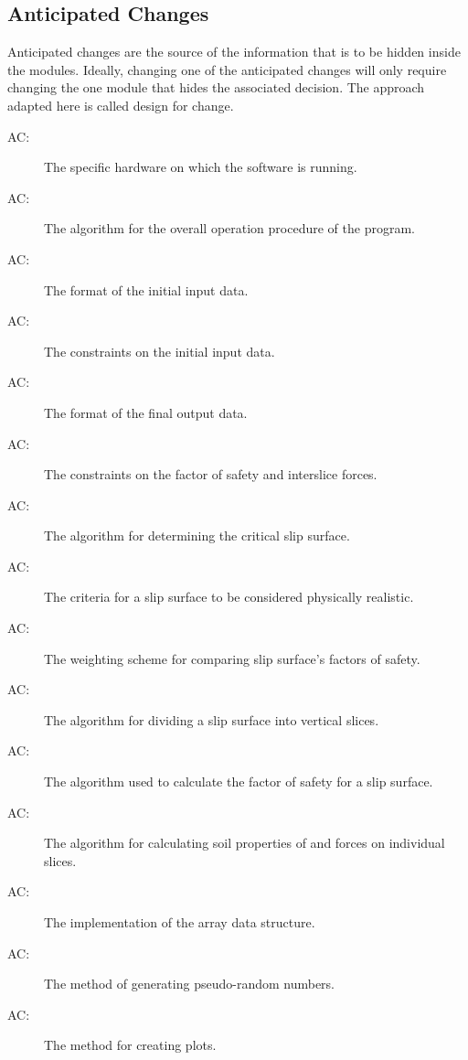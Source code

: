 \documentclass[12pt, titlepage]{article}
\newcounter{acnum}
\begin{document}
\subsection{Anticipated Changes} \label{SecAchange}

\hspace{3ex}Anticipated changes are the source of the information that
is to be hidden inside the modules. Ideally, changing one of the
anticipated changes will only require changing the one module that
hides the associated decision. The approach adapted here is called
design for change.

\begin{description}
\item[AC\theacnum \label{AC_hardware}:] The
  specific hardware on which the software is running.
\item[AC\theacnum \label{AC_Control}:] The
  algorithm for the overall operation procedure of the program.
\item[AC\theacnum \label{AC_input}:] The format
  of the initial input data.
\item[AC\theacnum \label{AC_inputConstraints}:] The       
constraints on the initial input data.
\item[AC\theacnum \label{AC_output}:] The format
  of the final output data.
\item[AC\theacnum \label{AC_outputConstraints}:] The     
constraints on the factor of safety and interslice forces.
\item[AC\theacnum \label{AC_GenAlg}:] The algorithm
  for determining the critical slip surface.
\item[AC\theacnum \label{AC_Kin}:] The criteria for
  a slip surface to be considered physically realistic.
\item[AC\theacnum \label{AC_FSweight}:] The
  weighting scheme for comparing slip surface's factors of safety.
\item[AC\theacnum \label{AC_Slicer}:] The
  algorithm for dividing a slip surface into vertical slices.
\item[AC\theacnum \label{AC_CalcFS}:] The algorithm used 
to calculate the factor of safety for a slip surface.
\item[AC\theacnum \label{AC_PropSorter}:] The
  algorithm for calculating soil properties of and forces on individual slices.
\item[AC\theacnum \label{AC_Array}:] The
  implementation of the array data structure.
\item[AC\theacnum \label{AC_Rand}:] The method
  of generating pseudo-random numbers.
\item[AC\theacnum \label{AC_Plot}:] The method
  for creating plots.
\end{description}
\end{document}
